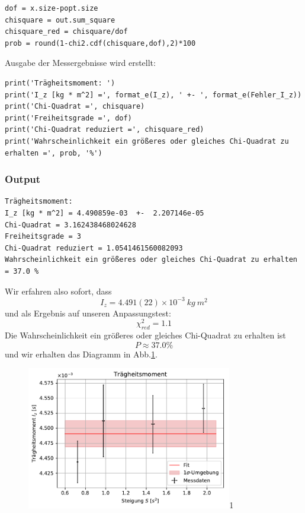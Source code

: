 \documentclass[a4paper,10pt]{article}
\begin{document}
\begin{lstlisting}
dof = x.size-popt.size
chisquare = out.sum_square
chisquare_red = chisquare/dof
prob = round(1-chi2.cdf(chisquare,dof),2)*100

\end{lstlisting}

Ausgabe der Messergebnisse wird erstellt:\begin{lstlisting}
print('Trägheitsmoment: ')
print('I_z [kg * m^2] =', format_e(I_z), ' +- ', format_e(Fehler_I_z))
print('Chi-Quadrat =', chisquare)
print('Freiheitsgrade =', dof)
print('Chi-Quadrat reduziert =', chisquare_red)
print('Wahrscheinlichkeit ein größeres oder gleiches Chi-Quadrat zu erhalten =', prob, '%')

\end{lstlisting}

\subsubsection{Output}

\begin{lstlisting}
Trägheitsmoment: 
I_z [kg * m^2] = 4.490859e-03  +-  2.207146e-05
Chi-Quadrat = 3.162438468024628
Freiheitsgrade = 3
Chi-Quadrat reduziert = 1.0541461560082093
Wahrscheinlichkeit ein größeres oder gleiches Chi-Quadrat zu erhalten = 37.0 %

\end{lstlisting}
Wir erfahren also sofort, dass
\[I_z =4.491(22)\times10^{-3}\: kg\: m^2\]
und als Ergebnis auf unseren Anpassungstest:
\[\chi^{2}_{red}=1.1\]
Die Wahrscheinlichkeit ein größeres oder gleiches Chi-Quadrat zu erhalten ist
 \[P \approx 37.0 \%\]
und wir erhalten das Diagramm in Abb.\ref{fig:Fig3}.
\begin{figure}[htb]
  \centering
  \begin{annotate}{\includegraphics[width=0.8\textwidth]{213_Fig3.pdf}}{1}
  \end{annotate}
\caption{}
\label{fig:Fig3}
\end{figure}
\end{document}

